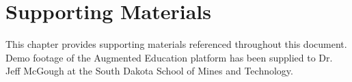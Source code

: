 \chapter{Supporting Materials}
\label{ch:support}

This chapter provides supporting materials referenced throughout this document. Demo footage of the Augmented Education platform has been supplied to Dr. Jeff McGough at the South Dakota School of Mines and Technology.












 


